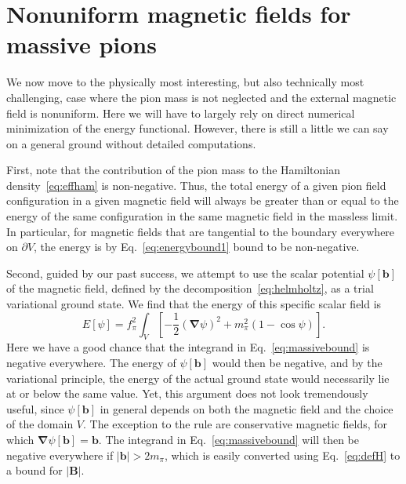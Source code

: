 \documentclass[pdflatex,iicol,sn-mathphys-num]{sn-jnl}
\let\de=\partial
\newcommand{\vek}[1]{\bm{#1}}%
\newcommand{\grad}{\vek\nabla}%
\newcommand{\bmag}{b}%
\begin{document}

\section{Nonuniform magnetic fields for massive pions}
\label{sec:nonuniformBnonzeroM}

We now move to the physically most interesting, but also technically most challenging, case where the pion mass is not neglected and the external magnetic field is nonuniform. Here we will have to largely rely on direct numerical minimization of the energy functional. However, there is still a little we can say on a general ground without detailed computations.

First, note that the contribution of the pion mass to the Hamiltonian density~\eqref{eq:effham} is non-negative. Thus, the total energy of a given pion field configuration in a given magnetic field will always be greater than or equal to the energy of the same configuration in the same magnetic field in the massless limit. In particular, for magnetic fields that are tangential to the boundary everywhere on $\de V$, the energy is by Eq.~\eqref{eq:energybound1} bound to be non-negative.

Second, guided by our past success, we attempt to use the scalar potential $\psi[\vek\bmag]$ of the magnetic field, defined by the decomposition~\eqref{eq:helmholtz}, as a trial variational ground state. We find that the energy of this specific scalar field is
\begin{equation}
E[\psi]=f_\pi^2\int_V\left[-\frac{1}{2}(\grad\psi)^2+m_\pi^2(1-\cos\psi)\right].
\label{eq:massivebound}
\end{equation}
Here we have a good chance that the integrand in Eq.~\eqref{eq:massivebound} is negative everywhere. The energy of $\psi[\vek\bmag]$ would then be negative, and by the variational principle, the energy of the actual ground state would necessarily lie at or below the same value. Yet, this argument does not look tremendously useful, since $\psi[\vek\bmag]$ in general depends on both the magnetic field and the choice of the domain $V$. The exception to the rule are conservative magnetic fields, for which $\grad\psi[\vek\bmag]=\vek\bmag$. The integrand in Eq.~\eqref{eq:massivebound} will then be negative everywhere if $|\vek\bmag|>2m_\pi$, which is easily converted using Eq.~\eqref{eq:defH} to a bound for $|\vek B|$.
\end{document}

